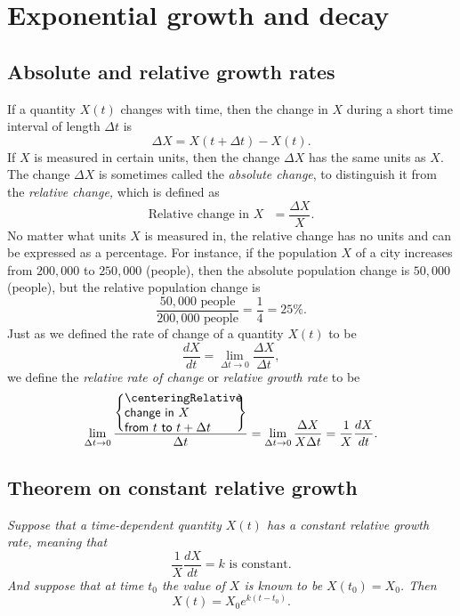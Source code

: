 \section{Exponential growth and decay} %
\subsection{Absolute and relative growth rates} %
If a quantity $X(t)$ changes with time, then the change in $X$ during a short
time interval of length $\Delta t$ is
\[
\Delta X = X(t+\Delta t) - X(t).
\]
If $X$ is measured in certain units, then the change $\Delta X$ has
the same units as $X$.  The change $\Delta X$ is sometimes called the
\emph{absolute change}, to distinguish it from the \emph{relative
  change,} which is defined as
\[
\text{Relative change in $X$ }= \frac{\Delta X} {X}.
\]
No matter what units $X$ is measured in, the relative change has no
units and can be expressed as a percentage.  For instance, if the
population $X$ of a city increases from $200,000$ to $250,000$
(people), then the absolute population change is $50,000$ (people),
but the relative population change is
\[
\frac{50,000\text{ people}}
{200,000\text{ people}} =
\frac{1} {4} = 25\%.
\]
Just as we defined the rate of change of a quantity $X(t)$ to be
\[
\frac{dX} {dt} = \lim_{\Delta t\to0} \frac{\Delta X} {\Delta t},
\]
we define the \emph{relative rate of change} or \emph{relative growth
  rate} to be
\[
\lim_{\Delta t \to 0}
\frac{\left\{
    \parbox{90pt}{\sffamily\centering%
      Relative change in $X$\\
      from $t$ to $t+\Delta t$ }
  \right\}} {\Delta t}
= \lim_{\Delta t \to 0} \frac{\Delta X} {X \Delta t}
= \frac{1} {X}\frac{dX} {dt}.
\]




\subsection{Theorem on constant relative growth} %
\label{sec:07const-relative-growth}
\itshape%
Suppose that a time-dependent quantity $X(t)$ has a constant relative
growth rate, meaning that
\begin{equation}
  \frac{1} {X} \frac{dX} {dt} = k \text{ is constant.}
  \label{eq:07constant-relative-growth}
\end{equation}
And suppose that at time $t_0$ the value of $X$ is known to be
$X(t_0) = X_0$.  Then
\begin{equation}\label{eq:07exponentialgrowth}
  X(t) = X_0 e^{k(t-t_0)}.
\end{equation}
\upshape



